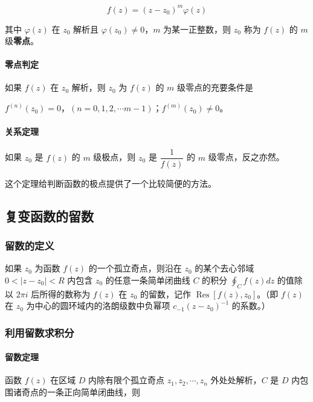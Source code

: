 \[ f(z) = (z - z_{0})^{m} \varphi(z) \]

其中 \(\varphi(z)\) 在 \(z_{0}\) 解析且 \(\varphi(z_{0}) \neq 0\)，\(m\)
为某一正整数，则 \(z_{0}\) 称为 \(f(z)\) 的 \(m\) 级\textbf{零点}。
\paragraph{零点判定}
\label{零点判定}
如果 \(f(z)\) 在 \(z_{0}\) 解析，则 \(z_{0}\) 为 \(f(z)\) 的 \(m\)
级零点的充要条件是

\(f^{(n)}(z_{0})=0\)，\((n=0,1,2,\cdots m-1)\)；\(f^{(m)}(z_{0})\neq 0\)。
\paragraph{关系定理}
\label{关系定理}
如果 \(z_0\) 是 \(f(z)\) 的 \(m\) 级极点，则 \(z_0\) 是
\(\dfrac{1}{f(z)}\) 的 \(m\) 级零点，反之亦然。

\begin{tcolorbox}[title={Info},colback=red!5!white
,colframe=red!75!black
,colbacktitle=yellow!50!red
,coltitle=red!25!black, fonttitle=\bfseries,subtitle style={boxrule=0.4pt, colback=yellow!50!red!25!white}]
这个定理给判断函数的极点提供了一个比较简便的方法。

\end{tcolorbox}
\subsection{复变函数的留数}
\label{复变函数的留数}
\subsubsection{留数的定义}
\label{留数的定义}
如果 \(z_{0}\) 为函数 \(f(z)\) 的一个孤立奇点，则沿在 \(z_{0}\)
的某个去心邻域 \(0<|z-z_{0}|<R\) 内包含 \(z_{0}\) 的任意一条简单闭曲线
\(C\) 的积分 \(\oint_{C} f(z)dz\) 的值除以 \(2\pi i\) 后所得的数称为
\(f(z)\) 在 \(z_{0}\) 的留数，记作
\(\operatorname{Res}[f(z),z_{0}]\)。（即 \(f(z)\) 在 \(z_{0}\)
为中心的圆环域内的洛朗级数中负幂项 \(c_{-1}(z-z_{0})^{-1}\) 的系数。）
\subsubsection{利用留数求积分}
\label{利用留数求积分}
\paragraph{留数定理}
\label{留数定理}
函数 \(f(z)\) 在区域 \(D\) 内除有限个孤立奇点
\(z_{1},z_{2},\cdots ,z_{n}\) 外处处解析，\(C\) 是 \(D\)
内包围诸奇点的一条正向简单闭曲线，则

